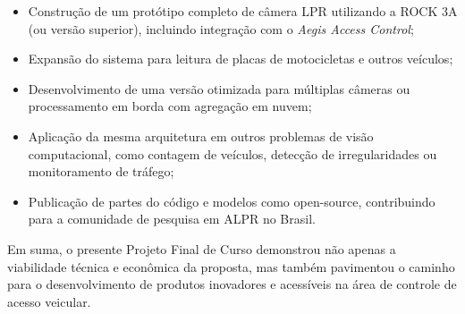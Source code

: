 \begin{itemize}
    \item Construção de um protótipo completo de câmera LPR utilizando a ROCK 3A (ou versão superior), incluindo integração com o \textit{Aegis Access Control};
    \item Expansão do sistema para leitura de placas de motocicletas e outros veículos;
    \item Desenvolvimento de uma versão otimizada para múltiplas câmeras ou processamento em borda com agregação em nuvem;
    \item Aplicação da mesma arquitetura em outros problemas de visão computacional, como contagem de veículos, detecção de irregularidades ou monitoramento de tráfego;
    \item Publicação de partes do código e modelos como open-source, contribuindo para a comunidade de pesquisa em ALPR no Brasil.
\end{itemize}

Em suma, o presente Projeto Final de Curso demonstrou não apenas a viabilidade técnica e econômica da proposta, mas também pavimentou o caminho para o desenvolvimento de produtos inovadores e acessíveis na área de controle de acesso veicular.